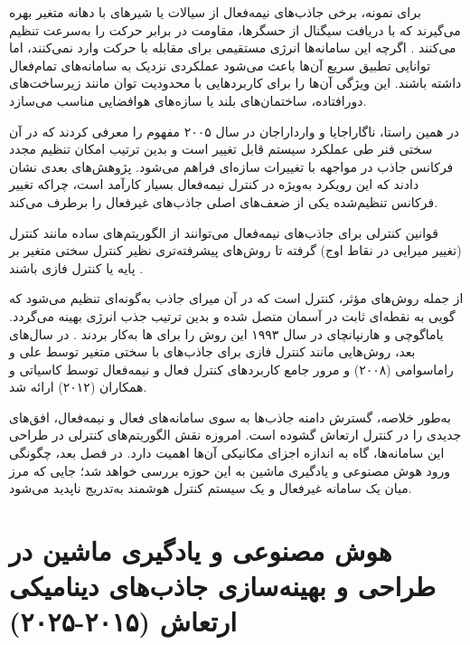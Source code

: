 برای نمونه، برخی جاذب‌های نیمه‌فعال از سیالات  یا شیرهای با دهانه متغیر بهره می‌گیرند که با دریافت سیگنال از حسگرها، مقاومت در برابر حرکت را به‌سرعت تنظیم می‌کنند \cite{eroglu2013observer, jenivssemi, masa2023review, peng2011development}. اگرچه این سامانه‌ها انرژی مستقیمی برای مقابله با حرکت وارد نمی‌کنند، اما توانایی تطبیق سریع آن‌ها باعث می‌شود عملکردی نزدیک به سامانه‌های تمام‌فعال داشته باشند. این ویژگی آن‌ها را برای کاربردهایی با محدودیت توان مانند زیرساخت‌های دورافتاده، ساختمان‌های بلند یا سازه‌های هوافضایی مناسب می‌سازد.

در همین راستا، ناگاراجایا و وارداراجان در سال ۲۰۰۵ مفهوم  را معرفی کردند \cite{nagarajaiah2005short} که در آن سختی فنر طی عملکرد سیستم قابل تغییر است و بدین ترتیب امکان تنظیم مجدد فرکانس جاذب در مواجهه با تغییرات سازه‌ای فراهم می‌شود. پژوهش‌های بعدی \cite{nagarajaiah2009adaptive} نشان دادند که این رویکرد به‌ویژه در کنترل نیمه‌فعال بسیار کارآمد است، چراکه تغییر فرکانس تنظیم‌شده یکی از ضعف‌های اصلی جاذب‌های غیرفعال را برطرف می‌کند.

قوانین کنترلی برای جاذب‌های نیمه‌فعال می‌توانند از الگوریتم‌های ساده مانند کنترل  (تغییر میرایی در نقاط اوج) گرفته تا روش‌های پیشرفته‌تری نظیر کنترل سختی متغیر بر پایه  یا کنترل فازی باشند \cite{ali2008semi, nguyen2018modeling, zhang2023seismic, kim2012semi, li2006fuzzy}.

از جمله روش‌های مؤثر، کنترل  است که در آن میرای جاذب به‌گونه‌ای تنظیم می‌شود که گویی به نقطه‌ای ثابت در آسمان متصل شده و بدین ترتیب جذب انرژی بهینه می‌گردد. یاماگوچی و هارنپانچای در سال ۱۹۹۳ این روش را برای ها به‌کار بردند \cite{yamaguchi1993fundamental}. در سال‌های بعد، روش‌هایی مانند کنترل فازی برای جاذب‌های با سختی متغیر توسط علی و راماسوامی (۲۰۰۸) \cite{ali2009optimal} و مرور جامع کاربردهای کنترل فعال و نیمه‌فعال توسط کاسیاتی و همکاران (۲۰۱۲) \cite{casciati2012active} ارائه شد.

به‌طور خلاصه، گسترش دامنه جاذب‌ها به سوی سامانه‌های فعال و نیمه‌فعال، افق‌های جدیدی را در کنترل ارتعاش گشوده است. امروزه نقش الگوریتم‌های کنترلی در طراحی این سامانه‌ها، گاه به اندازه اجزای مکانیکی آن‌ها اهمیت دارد. در فصل بعد، چگونگی ورود هوش مصنوعی و یادگیری ماشین به این حوزه بررسی خواهد شد؛ جایی که مرز میان یک سامانه غیرفعال و یک سیستم کنترل هوشمند به‌تدریج ناپدید می‌شود.


\section{هوش مصنوعی و یادگیری ماشین در طراحی و بهینه‌سازی جاذب‌های دینامیکی ارتعاش (۲۰۱۵-۲۰۲۵)}

